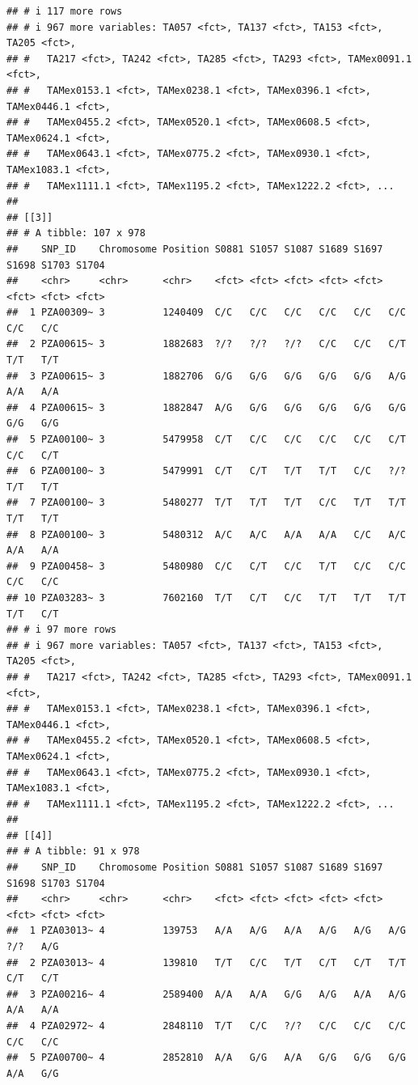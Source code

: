\documentclass[
]{article}
\begin{document}
\begin{verbatim}
## # i 117 more rows
## # i 967 more variables: TA057 <fct>, TA137 <fct>, TA153 <fct>, TA205 <fct>,
## #   TA217 <fct>, TA242 <fct>, TA285 <fct>, TA293 <fct>, TAMex0091.1 <fct>,
## #   TAMex0153.1 <fct>, TAMex0238.1 <fct>, TAMex0396.1 <fct>, TAMex0446.1 <fct>,
## #   TAMex0455.2 <fct>, TAMex0520.1 <fct>, TAMex0608.5 <fct>, TAMex0624.1 <fct>,
## #   TAMex0643.1 <fct>, TAMex0775.2 <fct>, TAMex0930.1 <fct>, TAMex1083.1 <fct>,
## #   TAMex1111.1 <fct>, TAMex1195.2 <fct>, TAMex1222.2 <fct>, ...
## 
## [[3]]
## # A tibble: 107 x 978
##    SNP_ID    Chromosome Position S0881 S1057 S1087 S1689 S1697 S1698 S1703 S1704
##    <chr>     <chr>      <chr>    <fct> <fct> <fct> <fct> <fct> <fct> <fct> <fct>
##  1 PZA00309~ 3          1240409  C/C   C/C   C/C   C/C   C/C   C/C   C/C   C/C  
##  2 PZA00615~ 3          1882683  ?/?   ?/?   ?/?   C/C   C/C   C/T   T/T   T/T  
##  3 PZA00615~ 3          1882706  G/G   G/G   G/G   G/G   G/G   A/G   A/A   A/A  
##  4 PZA00615~ 3          1882847  A/G   G/G   G/G   G/G   G/G   G/G   G/G   G/G  
##  5 PZA00100~ 3          5479958  C/T   C/C   C/C   C/C   C/C   C/T   C/C   C/T  
##  6 PZA00100~ 3          5479991  C/T   C/T   T/T   T/T   C/C   ?/?   T/T   T/T  
##  7 PZA00100~ 3          5480277  T/T   T/T   T/T   C/C   T/T   T/T   T/T   T/T  
##  8 PZA00100~ 3          5480312  A/C   A/C   A/A   A/A   C/C   A/C   A/A   A/A  
##  9 PZA00458~ 3          5480980  C/C   C/T   C/C   T/T   C/C   C/C   C/C   C/C  
## 10 PZA03283~ 3          7602160  T/T   C/T   C/C   T/T   T/T   T/T   T/T   C/T  
## # i 97 more rows
## # i 967 more variables: TA057 <fct>, TA137 <fct>, TA153 <fct>, TA205 <fct>,
## #   TA217 <fct>, TA242 <fct>, TA285 <fct>, TA293 <fct>, TAMex0091.1 <fct>,
## #   TAMex0153.1 <fct>, TAMex0238.1 <fct>, TAMex0396.1 <fct>, TAMex0446.1 <fct>,
## #   TAMex0455.2 <fct>, TAMex0520.1 <fct>, TAMex0608.5 <fct>, TAMex0624.1 <fct>,
## #   TAMex0643.1 <fct>, TAMex0775.2 <fct>, TAMex0930.1 <fct>, TAMex1083.1 <fct>,
## #   TAMex1111.1 <fct>, TAMex1195.2 <fct>, TAMex1222.2 <fct>, ...
## 
## [[4]]
## # A tibble: 91 x 978
##    SNP_ID    Chromosome Position S0881 S1057 S1087 S1689 S1697 S1698 S1703 S1704
##    <chr>     <chr>      <chr>    <fct> <fct> <fct> <fct> <fct> <fct> <fct> <fct>
##  1 PZA03013~ 4          139753   A/A   A/G   A/A   A/G   A/G   A/G   ?/?   A/G  
##  2 PZA03013~ 4          139810   T/T   C/C   T/T   C/T   C/T   T/T   C/T   C/T  
##  3 PZA00216~ 4          2589400  A/A   A/A   G/G   A/G   A/A   A/G   A/A   A/A  
##  4 PZA02972~ 4          2848110  T/T   C/C   ?/?   C/C   C/C   C/C   C/C   C/C  
##  5 PZA00700~ 4          2852810  A/A   G/G   A/A   G/G   G/G   G/G   A/A   G/G  

\end{verbatim}
\end{document}
